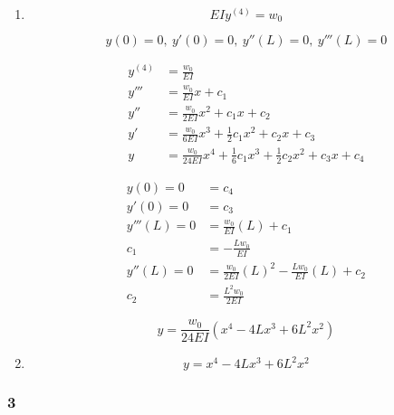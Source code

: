 \documentclass{article}
\begin{document}
\begin{enumerate}
  \item

        \[E I y^{(4)} = w_0\]

        \[y(0) = 0, \:y'(0) = 0, \:y''(L) = 0, \:y'''(L) = 0\]

        \begin{align*}
          y^{(4)} & = \frac{w_0}{E I}                                                                  \\
          y'''    & = \frac{w_0}{E I} x + c_1                                                          \\
          y''     & = \frac{w_0}{2 E I} x^2 + c_1 x + c_2                                              \\
          y'      & = \frac{w_0}{6 E I} x^3 + \frac{1}{2} c_1 x^2 + c_2 x + c_3                        \\
          y       & = \frac{w_0}{24 E I} x^4 + \frac{1}{6} c_1 x^3 + \frac{1}{2} c_2 x^2 + c_3 x + c_4
        \end{align*}

        \begin{align*}
          y(0) = 0    & = c_4                                                   \\
          y'(0) = 0   & = c_3                                                   \\
          y'''(L) = 0 & = \frac{w_0}{E I} (L) + c_1                             \\
          c_1         & = -\frac{L w_0}{E I}                                    \\
          y''(L) = 0  & = \frac{w_0}{2 E I} (L)^2 - \frac{L w_0}{E I} (L) + c_2 \\
          c_2         & = \frac{L^2 w_0}{2 E I}
        \end{align*}

        \[y = \frac{w_0}{24 E I} \left( x^4 - 4 L x^3 + 6 L^2 x^2 \right)\]

  \item \[y = x^4 - 4 L x^3 + 6 L^2 x^2\]
\end{enumerate}

\subsubsection{3}
\end{document}
